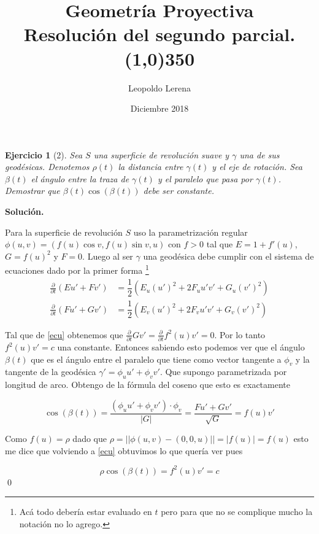 \documentclass{article}
\title{Geometría Proyectiva \\ \large Resolución del segundo parcial.  \\\line(1,0){350}}
\date{Diciembre 2018}
\author{Leopoldo Lerena}
\theoremstyle{plain} %
\newtheorem*{ej}{Ejercicio}
\theoremstyle{definition}
\begin{document}
	
	\maketitle

		
	\begin{ej}[2]
		Sea $S$ una superficie de revolución suave y $\gamma$ una de sus geodésicas. Denotemos $\rho(t)$ la distancia entre $\gamma(t)$ y el eje de rotación. Sea $\beta(t)$ el ángulo entre la traza de $\gamma(t)$ y el paralelo que pasa por $\gamma(t)$. Demostrar que $\beta(t)\cos(\beta(t))$ debe ser constante.
		
	\end{ej}

	\textbf{Solución.}
	
	Para la superficie de revolución $S$  uso la parametrización regular $\phi(u,v)=(f(u)\cos v, f(u) \sin v, u)$ con $f>0$ tal que $E=1+ f'(u)$, $G=f(u)^2$ y $F=0$. Luego al ser $\gamma$ una geodésica debe cumplir con el sistema de ecuaciones dado por la primer forma \footnote{Acá todo debería estar evaluado en $t$ pero para que no se complique mucho la notación no lo agrego.}
	\begin{align}\label{ecu}
	\frac{\partial}{\partial t}(Eu' + Fv') &=  \dfrac{1}{2}(E_u(u')^2 + 2F_u u'v' +G_u(v')^2) \\
	\frac{\partial}{\partial t}(Fu' + Gv') &=  \dfrac{1}{2}(E_v(u')^2 + 2F_v u'v' +G_v(v')^2)
	\end{align}
	
	Tal que de \ref{ecu} obtenemos que $\frac{\partial}{\partial t} Gv'= \frac{\partial}{\partial t} f^2(u)v'= 0$. Por lo tanto $f^2(u)v'= c$ una constante.  Entonces sabiendo esto podemos ver que el ángulo $\beta(t)$ que es el ángulo entre el paralelo que tiene como vector tangente a $\phi_v$  y la tangente de la geodésica $\gamma' = \phi_u u' + \phi_v v'$. Que supongo  parametrizada por longitud de arco.
	Obtengo de la fórmula del coseno que esto es exactamente
	
	\begin{equation*}
	\cos(\beta(t)) = \dfrac{(\phi_u u' + \phi_v v') \cdot \phi_v }{|G|} = \dfrac{Fu' + Gv'}{\sqrt G} = f(u)v'
	\end{equation*}
	
	Como $f(u)=\rho$ dado que $\rho = ||\phi(u,v) - (0,0,u)||=|f(u)|=f(u)$ esto me dice que volviendo a \ref{ecu} obtuvimos lo que quería ver pues 
	
	\begin{equation*}
	\rho \cos(\beta(t)) = f^2(u)v' = c
	\end{equation*}
	\qed
	
\end{document}
